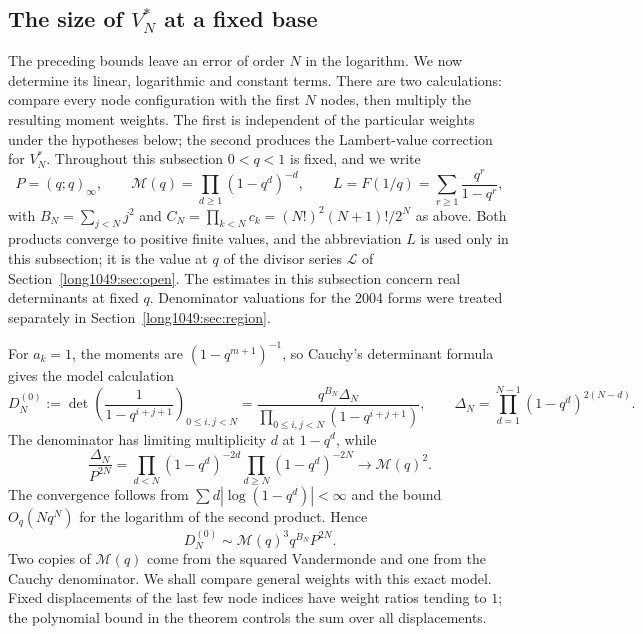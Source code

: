 \subsection{The size of \texorpdfstring{$V_N^*$}{V(N)} at a fixed base}
\label{long1049:sec:sharp-fixed-base}

The preceding bounds leave an error of order $N$ in the logarithm.
We now determine its linear, logarithmic and constant terms. There
are two calculations: compare every node configuration with the
first $N$ nodes, then multiply the resulting moment weights.
The first is independent of the particular weights under the
hypotheses below; the second produces the Lambert-value correction
for $V_N^*$. Throughout this subsection $0<q<1$ is fixed, and we write
\[
 P=(q;q)_\infty,\qquad
 \mathcal M(q)=\prod_{d\ge1}(1-q^d)^{-d},\qquad
 L=F(1/q)=\sum_{r\ge1}\frac{q^r}{1-q^r},
\]
with $B_N=\sum_{j<N}j^2$ and $C_N=\prod_{k<N}c_k=(N!)^2(N+1)!/2^N$ as above.
Both products converge to positive finite values, and the abbreviation $L$ is
used only in this subsection; it is the value at $q$ of the divisor series
$\mathcal L$ of Section~\ref{long1049:sec:open}.
The estimates in this subsection concern real determinants at fixed
$q$. Denominator valuations for the 2004 forms were treated separately
in Section~\ref{long1049:sec:region}.

For $a_k=1$, the moments are $(1-q^{m+1})^{-1}$, so Cauchy's
determinant formula gives the model calculation
\begin{equation}\label{long1049:eq:cauchy-model}
 D_N^{(0)}:=\det\left(\frac1{1-q^{i+j+1}}\right)_{0\le i,j<N}
 =\frac{q^{B_N}\Delta_N}{\prod_{0\le i,j<N}(1-q^{i+j+1})},
 \qquad
 \Delta_N=\prod_{d=1}^{N-1}(1-q^d)^{2(N-d)}.
\end{equation}
The denominator has limiting multiplicity $d$ at $1-q^d$, while
\[
 \frac{\Delta_N}{P^{2N}}
 =\prod_{d<N}(1-q^d)^{-2d}\prod_{d\ge N}(1-q^d)^{-2N}
 \longrightarrow\mathcal M(q)^2.
\]
The convergence follows from $\sum d|\log(1-q^d)|<\infty$ and the
bound $O_q(Nq^N)$ for the logarithm of the second product. Hence
\begin{equation}\label{long1049:eq:cauchy-model-limit}
 D_N^{(0)}\sim\mathcal M(q)^3q^{B_N}P^{2N}.
\end{equation}
Two copies of $\mathcal M(q)$ come from the squared Vandermonde
and one from the Cauchy denominator. We shall compare general
weights with this exact model. Fixed displacements of the last
few node indices have weight ratios tending to $1$; the polynomial
bound in the theorem controls the sum over all displacements.


